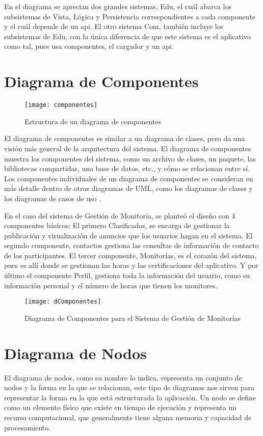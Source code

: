 En el diagrama se aprecian dos grandes sistemas, Edu, el cuál abarca los subsistemas de Vista, Lógica y Persistencia correspondientes a cada componente y el cuál depende de un api. El otro sistema Com, también incluye los subsistemas de Edu, con la única diferencia de que este sistema es el aplicativo como tal, pues usa componentes, el cargador y un api.

\newpage

\section{Diagrama de Componentes}
\begin{figure}[H]
	\centering
	\texttt{[image: componentes]}
	\centering
	\caption{Estructura de un diagrama de componentes}
	\label{fig:componentes}
\end{figure}

El diagrama de componentes es similar a un diagrama de clases, pero da una visión más
general de la arquitectura del sistema. El diagrama de componentes muestra los componentes
del sistema, como un archivo de clases, un paquete, las bibliotecas compartidas, una base
de datos, etc., y cómo se relacionan entre sí. Los componentes individuales de un diagrama de
componentes se consideran en más detalle dentro de otros diagramas de UML, como los
diagramas de clases y los diagramas de casos de uso \cite{Kendall_2005}.

En el caso del sistema de Gestión de Monitoría, se planteó el diseño con 4 componentes básicos: El primero Clasificados, se encarga de gestionar la publicación y visualización de anuncios que los usuarios hagan en el sistema. El segundo componente, contactos gestiona las consultas de información de contacto de los participantes. El tercer componente, Monitorías, es el corazón del sistema, pues es allí donde se gestionan las horas y las certificaciones del aplicativo. Y por último el componente Perfil, gestiona toda la información del usuario, como su información personal y el número de horas que tienen los monitores.

\begin{figure}[H]
	\centering
	\texttt{[image: dComponentes]}
	\centering
	\caption{Diagrama de Componentes para el Sistema de Gestión de Monitorías}
	\label{fig:dcomponentes}
\end{figure}
\newpage


\section{Diagrama de Nodos}
El diagrama de nodos, como su nombre lo indica, representa un conjunto de nodos y la forma en la que se relacionan, este tipo de diagramas nos sirven para representar la forma en la que está estructurada la aplicación. Un nodo se define como un elemento físico que existe en tiempo de ejecución y representa un recurso computacional, que generalmente tiene alguna memoria y capacidad de procesamiento\cite{Nodos}.

